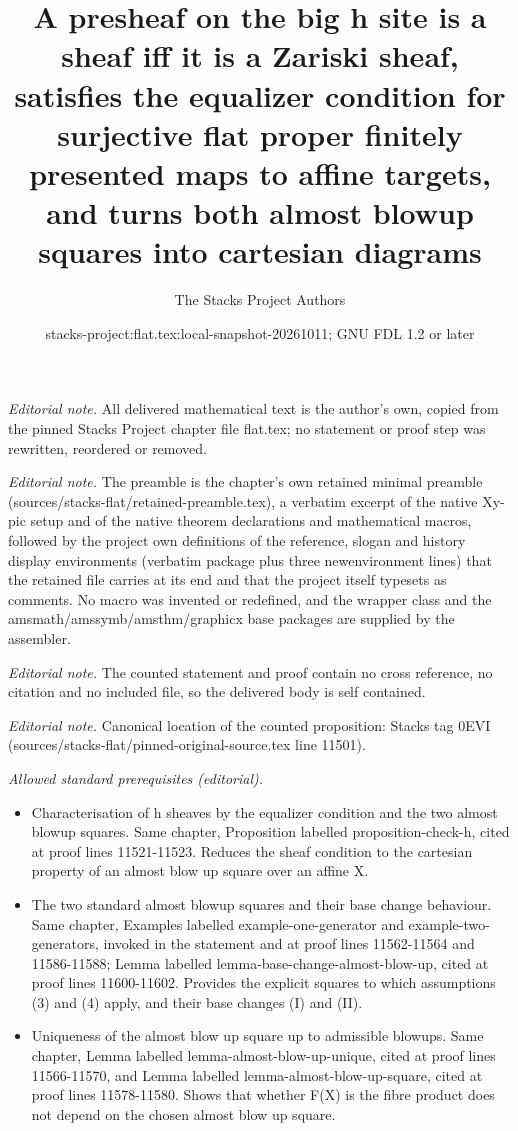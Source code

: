 \documentclass[10pt,a4paper]{amsart}
\title{A presheaf on the big h site is a sheaf iff it is a Zariski sheaf, satisfies the equalizer condition for surjective flat proper finitely presented maps to affine targets, and turns both almost blowup squares into cartesian diagrams}
\author{The Stacks Project Authors}
\date{stacks-project:flat.tex:local-snapshot-20261011; GNU FDL 1.2 or later}
\theoremstyle{plain}
\theoremstyle{definition}
\theoremstyle{remark}
\numberwithin{equation}{subsection}
\begin{document}
\maketitle
\noindent\textit{Editorial note.} All delivered mathematical text is the author's own, copied from the pinned Stacks Project chapter file flat.tex; no statement or proof step was rewritten, reordered or removed.\par\medskip
\noindent\textit{Editorial note.} The preamble is the chapter's own retained minimal preamble (sources/stacks-flat/retained-preamble.tex), a verbatim excerpt of the native Xy-pic setup and of the native theorem declarations and mathematical macros, followed by the project own definitions of the reference, slogan and history display environments (verbatim package plus three newenvironment lines) that the retained file carries at its end and that the project itself typesets as comments. No macro was invented or redefined, and the wrapper class and the amsmath/amssymb/amsthm/graphicx base packages are supplied by the assembler.\par\medskip
\noindent\textit{Editorial note.} The counted statement and proof contain no cross reference, no citation and no included file, so the delivered body is self contained.\par\medskip
\noindent\textit{Editorial note.} Canonical location of the counted proposition: Stacks tag 0EVI (sources/stacks-flat/pinned-original-source.tex line 11501).\par\medskip
\noindent\textit{Allowed standard prerequisites (editorial).}\begin{itemize}
\item Characterisation of h sheaves by the equalizer condition and the two almost blowup squares. Same chapter, Proposition labelled proposition-check-h, cited at proof lines 11521-11523. Reduces the sheaf condition to the cartesian property of an almost blow up square over an affine X.
\item The two standard almost blowup squares and their base change behaviour. Same chapter, Examples labelled example-one-generator and example-two-generators, invoked in the statement and at proof lines 11562-11564 and 11586-11588; Lemma labelled lemma-base-change-almost-blow-up, cited at proof lines 11600-11602. Provides the explicit squares to which assumptions (3) and (4) apply, and their base changes (I) and (II).
\item Uniqueness of the almost blow up square up to admissible blowups. Same chapter, Lemma labelled lemma-almost-blow-up-unique, cited at proof lines 11566-11570, and Lemma labelled lemma-almost-blow-up-square, cited at proof lines 11578-11580. Shows that whether F(X) is the fibre product does not depend on the chosen almost blow up square.
\end{itemize}\medskip
\end{document}
